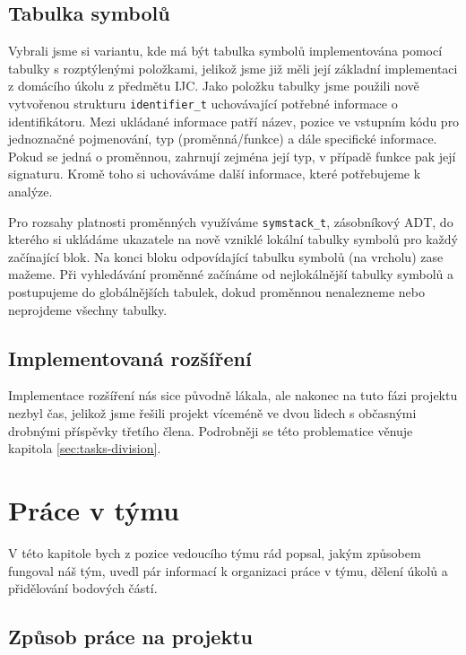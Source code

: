 \documentclass[11pt,a4paper]{article}
\begin{document}
    \subsection{Tabulka symbolů}
    \label{sec:symtable}
    
    Vybrali jsme si variantu, kde má být tabulka symbolů implementována pomocí tabulky s rozptýlenými položkami, jelikož jsme již měli její základní implementaci z domácího úkolu z předmětu IJC. Jako položku tabulky jsme použili nově vytvořenou strukturu \texttt{identifier\_t} uchovávající potřebné informace o identifikátoru. Mezi ukládané informace patří název, pozice ve vstupním kódu pro jednoznačné pojmenování, typ (proměnná/funkce) a dále specifické informace. Pokud se jedná o proměnnou, zahrnují zejména její typ, v případě funkce pak její signaturu. Kromě toho si uchováváme další informace, které potřebujeme k analýze.
    
    Pro rozsahy platnosti proměnných využíváme \texttt{symstack\_t}, zásobníkový ADT, do kterého si ukládáme ukazatele na nově vzniklé lokální tabulky symbolů pro každý začínající blok. Na konci bloku odpovídající tabulku symbolů (na vrcholu) zase mažeme. Při vyhledávání proměnné začínáme od nejlokálnější tabulky symbolů a postupujeme do globálnějších tabulek, dokud proměnnou nenalezneme nebo neprojdeme všechny tabulky.
    
    \subsection{Implementovaná rozšíření}
    
    Implementace rozšíření nás sice původně lákala, ale nakonec na tuto fázi projektu nezbyl čas, jelikož jsme řešili projekt víceméně ve dvou lidech s občasnými drobnými příspěvky třetího člena. Podrobněji se této problematice věnuje kapitola \ref{sec:tasks-division}.
    
\section{Práce v týmu}
\label{sec:team-work}

V této kapitole bych z pozice vedoucího týmu rád popsal, jakým způsobem fungoval náš tým, uvedl pár informací k organizaci práce v týmu, dělení úkolů a přidělování bodových částí.

\subsection{Způsob práce na projektu}
\label{sec:way-to-work-on-project}
\end{document}
